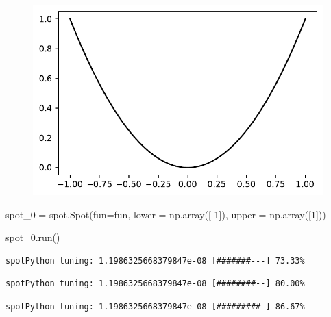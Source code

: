 \documentclass[
  letterpaper,
  DIV=11,
  numbers=noendperiod]{scrreprt}
\newenvironment{Shaded}{\begin{snugshade}}{\end{snugshade}}
\newcommand{\DecValTok}[1]{\textcolor[rgb]{0.68,0.00,0.00}{#1}}
\newcommand{\NormalTok}[1]{\textcolor[rgb]{0.00,0.23,0.31}{#1}}
\newcommand{\OperatorTok}[1]{\textcolor[rgb]{0.37,0.37,0.37}{#1}}
\begin{document}
\begin{figure}[H]

{\centering \includegraphics{007_num_spot_intro_files/figure-pdf/cell-4-output-1.pdf}

}

\end{figure}

\begin{Shaded}
\begin{Highlighting}[]
\NormalTok{spot\_0 }\OperatorTok{=}\NormalTok{ spot.Spot(fun}\OperatorTok{=}\NormalTok{fun,}
\NormalTok{                   lower }\OperatorTok{=}\NormalTok{ np.array([}\OperatorTok{{-}}\DecValTok{1}\NormalTok{]),}
\NormalTok{                   upper }\OperatorTok{=}\NormalTok{ np.array([}\DecValTok{1}\NormalTok{]))}
\end{Highlighting}
\end{Shaded}

\begin{Shaded}
\begin{Highlighting}[]
\NormalTok{spot\_0.run()}
\end{Highlighting}
\end{Shaded}

\begin{verbatim}
spotPython tuning: 1.1986325668379847e-08 [#######---] 73.33% 
\end{verbatim}

\begin{verbatim}
spotPython tuning: 1.1986325668379847e-08 [########--] 80.00% 
\end{verbatim}

\begin{verbatim}
spotPython tuning: 1.1986325668379847e-08 [#########-] 86.67% 
\end{verbatim}
\end{document}
